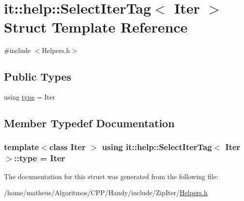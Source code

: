 \hypertarget{structit_1_1help_1_1SelectIterTag_3_01Iter_01_4}{}\section{it\+:\+:help\+:\+:Select\+Iter\+Tag$<$ Iter $>$ Struct Template Reference}
\label{structit_1_1help_1_1SelectIterTag_3_01Iter_01_4}


{\ttfamily \#include $<$Helpers.\+h$>$}

\subsection*{Public Types}
\begin{DoxyCompactItemize}
\item 
using \hyperlink{structit_1_1help_1_1SelectIterTag_3_01Iter_01_4_a7357cce64ed4c2e4a225b4dce5a5341d}{type} = Iter
\end{DoxyCompactItemize}


\subsection{Member Typedef Documentation}
\subsubsection[{\texorpdfstring{type}{type}}]{\setlength{\rightskip}{0pt plus 5cm}template$<$class Iter $>$ using {\bf it\+::help\+::\+Select\+Iter\+Tag}$<$ Iter $>$\+::{\bf type} =  Iter}\hypertarget{structit_1_1help_1_1SelectIterTag_3_01Iter_01_4_a7357cce64ed4c2e4a225b4dce5a5341d}{}\label{structit_1_1help_1_1SelectIterTag_3_01Iter_01_4_a7357cce64ed4c2e4a225b4dce5a5341d}


The documentation for this struct was generated from the following file\+:\begin{DoxyCompactItemize}
\item 
/home/matheus/\+Algoritmos/\+C\+P\+P/\+Handy/include/\+Zip\+Iter/\hyperlink{ZipIter_2Helpers_8h}{Helpers.\+h}\end{DoxyCompactItemize}
